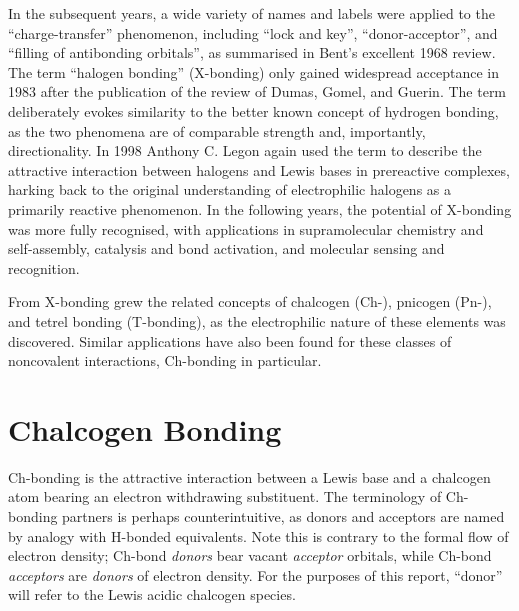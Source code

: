 \begin{refsection}
In the subsequent years, a wide variety of names and labels were applied to the ``charge-transfer'' phenomenon, including ``lock and key'', ``donor-acceptor'', and ``filling of antibonding orbitals'', as summarised in Bent's excellent 1968 review\autocite{Bent1968}.
The term ``halogen bonding'' (X-bonding) only gained widespread acceptance in 1983 after the publication of the review of Dumas, Gomel, and Guerin.\autocite{Dumas1983}
The term deliberately evokes similarity to the better known concept of hydrogen bonding, as the two phenomena are of comparable strength and, importantly, directionality.
In 1998 Anthony C. Legon again used the term to describe the attractive interaction between halogens and Lewis bases in prereactive complexes, harking back to the original understanding of electrophilic halogens as a primarily reactive phenomenon.\autocite{Legon1998,Legon1999}
In the following years, the potential of X-bonding was more fully recognised, with applications in supramolecular chemistry and self-assembly\autocite{Corradi2000,Metrangolo2008,Priimagi2013}, catalysis and bond activation\autocite{Walter2011,Soloshonok2017,Takagi2017}, and molecular sensing and recognition\autocite{Cornes2017,VargasJentzsch2013,Borissov2017}.

From X-bonding grew the related concepts of chalcogen (Ch-), pnicogen (Pn-), and tetrel bonding (T-bonding), as the electrophilic nature of these elements was discovered.\autocite{Murray2007}
Similar applications have also been found for these classes of noncovalent interactions, Ch-bonding in particular.\autocite{Fanfrlik2014,Garrett2016,Ho2016,Wonner2017,Mitchell2017,Benz2017,Biot2018,Ho2017}

\section{Chalcogen Bonding}
Ch-bonding is the attractive interaction between a Lewis base and a chalcogen atom bearing an electron withdrawing substituent.
The terminology of Ch-bonding partners is perhaps counterintuitive, as donors and acceptors are named by analogy with H-bonded equivalents.
Note this is contrary to the formal flow of electron density; Ch-bond \emph{donors} bear vacant \emph{acceptor} orbitals, while Ch-bond \emph{acceptors} are \emph{donors} of electron density.
For the purposes of this report, ``donor'' will refer to the Lewis acidic chalcogen species.


\end{refsection}
